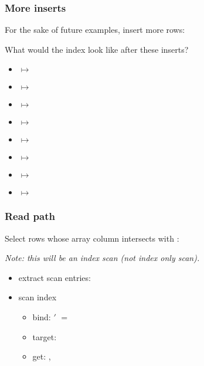 \begin{frame}
  \frametitle{More inserts}
  For the sake of future examples, insert more rows:



  \pause

  What would the index look like after these inserts?
  \pause

  \begin{itemize}
    \item {} $\mapsto$ 
    \item {} $\mapsto$ 
    \item {} $\mapsto$ 
    \item {} $\mapsto$ 
    \item {} $\mapsto$ 
    \item {} $\mapsto$ 
    \item {} $\mapsto$ 
    \item {} $\mapsto$ 
  \end{itemize}
\end{frame}

\begin{frame}
  \frametitle{Read path}
  Select rows whose array column intersects with :

  \pause

  \emph{Note: this will be an index scan (not index only scan).}
  \pause

  \begin{itemize}
    \item extract scan entries: 
      \pause
    \item scan index
      \begin{itemize}
        \item bind: $'$ $=$ 
          \pause
        \item target: 
          \pause
        \item get: , 
      \end{itemize}
  \end{itemize}
\end{frame}

